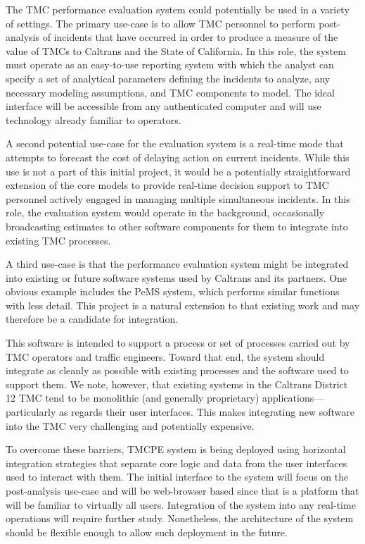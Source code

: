\documentclass[12pt]{report}
\newcounter{time}
\begin{document}
The \ac{TMC} performance evaluation system could potentially be used in a
variety of settings. The primary use-case is to allow \ac{TMC} personnel to
perform post-analysis of incidents that have occurred in order to produce a
measure of the value of \acp{TMC} to Caltrans and the State of California. In
this role, the system must operate as an easy-to-use reporting system with which
the analyst can specify a set of analytical parameters defining the incidents to
analyze, any necessary modeling assumptions, and \ac{TMC} components to
model. The ideal interface will be accessible from any authenticated computer
and will use technology already familiar to operators.

A second potential use-case for the evaluation system is a real-time
mode that attempts to forecast the cost of delaying action on current
incidents. While this use is not a part of this initial project, it
would be a potentially straightforward extension of the core models to
provide real-time decision support to \ac{TMC} personnel actively
engaged in managing multiple simultaneous incidents. In this role, the
evaluation system would operate in the background, occasionally
broadcasting estimates to other software components for them to
integrate into existing \ac{TMC} processes.

A third use-case is that the performance evaluation system might be integrated
into existing or future software systems used by Caltrans and its partners. One
obvious example includes the \ac{PeMS} system, which performs similar functions
with less detail. This project is a natural extension to that existing work and
may therefore be a candidate for integration.

This software is intended to support a process or set of processes carried out
by \ac{TMC} operators and traffic engineers.  Toward that end, the system should
integrate as cleanly as possible with existing processes and the software used
to support them.  We note, however, that existing systems in the Caltrans
District 12 \ac{TMC} tend to be monolithic (and generally proprietary)
applications---particularly as regards their user interfaces.  This makes
integrating new software into the \ac{TMC} very challenging and potentially
expensive.

To overcome these barriers, \ac{TMCPE} system is being deployed using horizontal
integration strategies that separate core logic and data from the user
interfaces used to interact with them.  The initial interface to the system will
focus on the post-analysis use-case and will be web-browser based since that is
a platform that will be familiar to virtually all users.  Integration of the
system into any real-time operations will require further study.  Nonetheless,
the architecture of the system should be flexible enough to allow such
deployment in the future.
\end{document}

